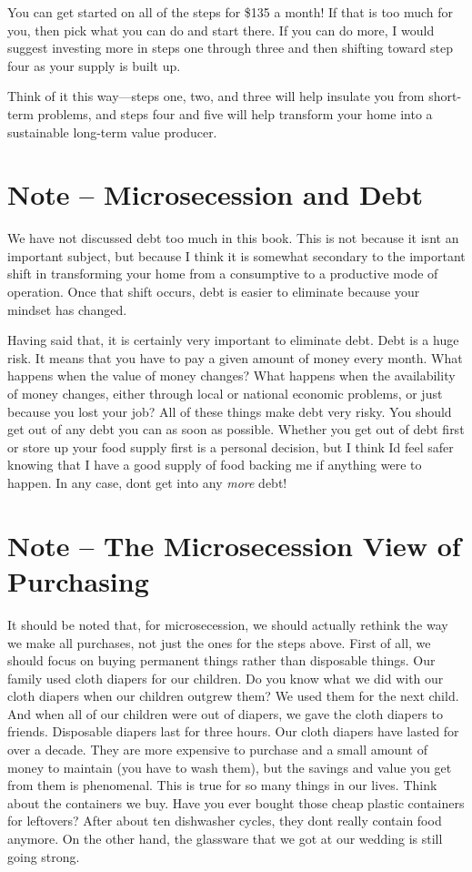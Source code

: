 You can get started on all of the steps for \$135 a
month! If that is too
much for you, then pick what you can do and start there. If you can do
more, I would suggest investing more in steps one through three and
then shifting toward step four as your supply is built up.

Think of it this way—steps one, two, and three will help insulate you
from short-term problems, and steps four and five will help transform
your home into a sustainable long-term value producer.

\section{Note – Microsecession and Debt}

We have not discussed debt too much in this book. This is not because it
isn{\textquotesingle}t an important subject, but because I think it is
somewhat secondary to the important shift in transforming your home
from a consumptive to a productive mode of operation. Once that shift
occurs, debt is easier to eliminate because your mindset has changed. 

Having said that, it is certainly very important to eliminate debt. Debt
is a huge risk. It means that you have to pay a given amount of money
every month. What happens when the value of money changes?  What
happens when the availability of money changes, either through local or
national economic problems, or just because you lost your job?  All of
these things make debt very risky. You should get out of any debt you
can as soon as possible. Whether you get out of debt first or store up
your food supply first is a personal decision, but I think
I{\textquotesingle}d feel safer knowing that I have a good supply of
food backing me if anything were to happen. In any case,
don{\textquotesingle}t get into any \textit{more} debt!

\section{Note – The Microsecession View of Purchasing}

It should be noted that, for microsecession, we should actually rethink
the way we make all purchases, not just the ones for the steps above.
First of all, we should focus on buying permanent things rather than
disposable things. Our family used cloth diapers for our children. Do
you know what we did with our cloth diapers when our children outgrew
them?  We used them for the next child. And when all of our children
were out of diapers, we gave the cloth diapers to friends.
Disposable diapers
last for three hours. Our cloth diapers have lasted for over a decade.
They are more expensive to purchase and a small amount of money to
maintain (you have to wash them), but the savings and value you get
from them is phenomenal. This is true for so many things in our lives.
Think about the containers we buy. Have you ever bought those cheap
plastic containers for leftovers?  After about ten dishwasher cycles,
they don{\textquotesingle}t really contain food anymore. On the other
hand, the glassware that we got at our wedding is still going strong. 

